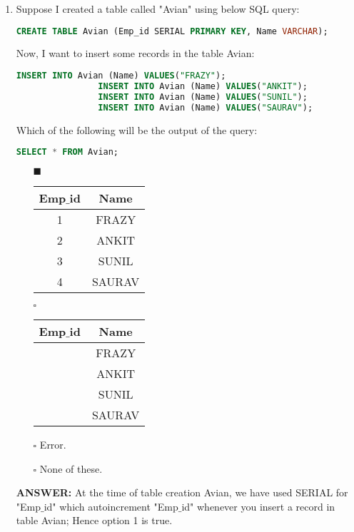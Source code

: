 \documentclass[10pt]{article}
\newcommand{\lightrule}{%
	\arrayrulecolor{black!30}%
	\midrule[\lightrulewidth]%
	\arrayrulecolor{black}}
\begin{document}
\begin{enumerate}
		\item Suppose I created a table called "Avian" using below SQL query: 
			\begin{lstlisting}[language=SQL,firstline=1, lastline=1] 
				CREATE TABLE Avian (Emp_id SERIAL PRIMARY KEY, Name VARCHAR);
			\end{lstlisting}
			Now, I want to insert some records in the table Avian:
			\begin{lstlisting}[language=SQL,firstline=1, lastline=4] 
				INSERT INTO Avian (Name) VALUES("FRAZY");
				INSERT INTO Avian (Name) VALUES("ANKIT");
				INSERT INTO Avian (Name) VALUES("SUNIL");
				INSERT INTO Avian (Name) VALUES("SAURAV");
			\end{lstlisting}
			Which of the following will be the output of the query:
			\begin{lstlisting}[language=SQL,firstline=1, lastline=1] 
				SELECT * FROM Avian;
			\end{lstlisting}

			\begin{enumerate}
				\item[$\blacksquare$]
					\begin{tabular}{@{} *{2}{c} @{}}
						\toprule
							\textbf{Emp$\_$id} & \textbf{Name} \\
						\midrule
							1 & FRAZY \\
						\lightrule
							2 & ANKIT \\
						\lightrule
							3 & SUNIL \\
						\lightrule
							4 & SAURAV \\
						\bottomrule
					\end{tabular}

				\item[$\square$]
					\begin{tabular}{@{} *{2}{c} @{}}
						\toprule
							\textbf{Emp$\_$id} & \textbf{Name} \\
						\midrule
							& FRAZY \\
						\lightrule
							& ANKIT \\
						\lightrule
							& SUNIL \\
						\lightrule
							& SAURAV \\
						\bottomrule
					\end{tabular}

				\item[$\square$] Error.
				\item[$\square$] None of these.
			\end{enumerate}
			\color{red} \textbf{ANSWER:} \color{black} At the time of table creation Avian, we have used SERIAL for "Emp$\_$id" which autoincrement "Emp$\_$id" whenever you insert a record in table Avian; Hence option 1 is true.
	\end{enumerate}
\end{document}
